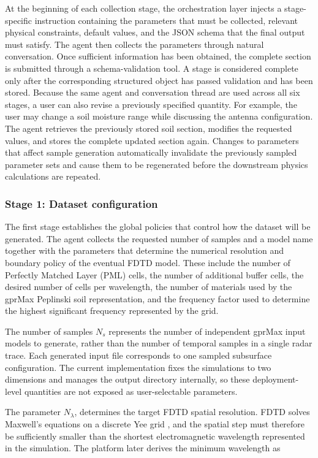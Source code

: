 \documentclass[journal]{IEEEtran}
\begin{document}
At the beginning of each collection stage, the orchestration layer injects a stage-specific instruction containing the parameters that must be collected, relevant physical constraints, default values, and the JSON schema that the final output must satisfy. The agent then collects the parameters through natural conversation. Once sufficient information has been obtained, the complete section is submitted through a schema-validation tool. A stage is considered complete only after the corresponding structured object has passed validation and has been stored. Because the same agent and conversation thread are used across all six stages, a user can also revise a previously specified quantity. For example, the user may change a soil moisture range while discussing the antenna configuration. The agent retrieves the previously stored soil section, modifies the requested values, and stores the complete updated section again. Changes to parameters that affect sample generation automatically invalidate the previously sampled parameter sets and cause them to be regenerated before the downstream physics calculations are repeated.

\subsubsection{Stage 1: Dataset configuration}

The first stage establishes the global policies that control how the dataset will be generated. The agent collects the requested number of samples and a model name together with the parameters that determine the numerical resolution and boundary policy of the eventual FDTD model. These include the number of Perfectly Matched Layer (PML) cells, the number of additional buffer cells, the desired number of cells per wavelength, the number of materials used by the gprMax Peplinski soil representation, and the frequency factor used to determine the highest significant frequency represented by the grid.

The number of samples \(N_s\) represents the number of independent gprMax input models to generate, rather than the number of temporal samples in a single radar trace. Each generated input file corresponds to one sampled subsurface configuration. The current implementation fixes the simulations to two dimensions and manages the output directory internally, so these deployment-level quantities are not exposed as user-selectable parameters.

The parameter \(N_{\lambda}\), determines the target FDTD spatial resolution. FDTD solves Maxwell's equations on a discrete Yee grid \cite{yee1966numerical}, and the spatial step must therefore be sufficiently smaller than the shortest electromagnetic wavelength represented in the simulation. The platform later derives the minimum wavelength as
\end{document}
